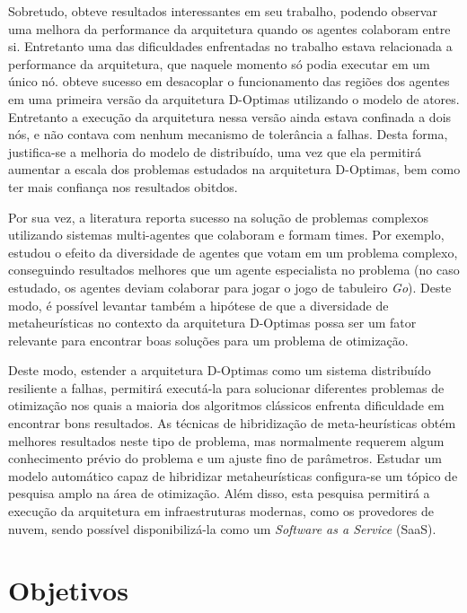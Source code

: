 Sobretudo,  obteve resultados interessantes em seu trabalho, podendo observar uma melhora da performance da arquitetura quando os agentes colaboram entre si. Entretanto uma das dificuldades enfrentadas no trabalho estava relacionada a performance da arquitetura, que naquele momento só podia executar em um único nó.  obteve sucesso em desacoplar o funcionamento das regiões dos agentes em uma primeira versão da arquitetura D-Optimas utilizando o modelo de atores. Entretanto a execução da arquitetura nessa versão ainda estava confinada a dois nós, e não contava com nenhum mecanismo de tolerância a falhas. Desta forma, justifica-se a melhoria do modelo de distribuído, uma vez que ela permitirá aumentar a escala dos problemas estudados na arquitetura D-Optimas, bem como ter mais confiança nos resultados obitdos.

Por sua vez, a literatura reporta sucesso na solução de problemas complexos utilizando sistemas multi-agentes que colaboram e formam times. Por exemplo,  estudou o efeito da diversidade de agentes que votam em um problema complexo, conseguindo resultados melhores que um agente especialista no problema (no caso estudado, os agentes deviam colaborar para jogar o jogo de tabuleiro \textit{Go}). Deste modo, é possível levantar também a hipótese de que a diversidade de metaheurísticas no contexto da arquitetura D-Optimas possa ser um fator relevante para encontrar boas soluções para um problema de otimização. 

Deste modo, estender a arquitetura D-Optimas como um sistema distribuído resiliente a falhas, permitirá executá-la para solucionar diferentes problemas de otimização nos quais a maioria dos algoritmos clássicos enfrenta dificuldade em encontrar bons resultados. As técnicas de hibridização de meta-heurísticas obtém melhores resultados neste tipo de problema, mas normalmente requerem algum conhecimento prévio do problema e um ajuste fino de parâmetros. Estudar um modelo automático capaz de hibridizar metaheurísticas configura-se um tópico de pesquisa amplo na área de otimização. Além disso, esta pesquisa permitirá a execução da arquitetura em infraestruturas modernas, como os provedores de nuvem, sendo possível disponibilizá-la como um \textit{Software as a Service} (SaaS).

\section{Objetivos}

